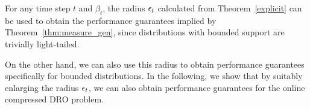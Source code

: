 
For any time step $t$ and $\beta_t$, the radius $\epsilon_t$ calculated from Theorem~\ref{explicit} can be used to obtain the performance guarantees implied by Theorem~\ref{thm:measure_gen}, since distributions with bounded support are trivially light-tailed. 

On the other hand, we can also use this radius to obtain performance guarantees specifically for bounded distributions. 
In the following, we show that by suitably enlarging the radius $\epsilon_t$, we can also obtain performance guarantees for the online compressed \gls{DRO} problem. 

